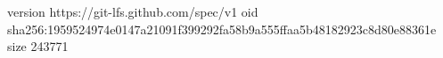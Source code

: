 version https://git-lfs.github.com/spec/v1
oid sha256:1959524974e0147a21091f399292fa58b9a555ffaa5b48182923c8d80e88361e
size 243771
